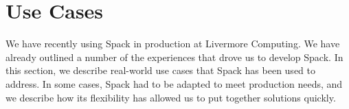 
\section{Use Cases}
\label{sec:usecases}

We have recently using Spack in production at 
Livermore Computing.  We have already outlined a number of the
experiences that drove us to develop Spack.
In this section, we describe real-world use cases that Spack
has been used to address.  In some cases, Spack had to be 
adapted to meet production needs, and we describe how its
flexibility has allowed us to put together solutions quickly.



